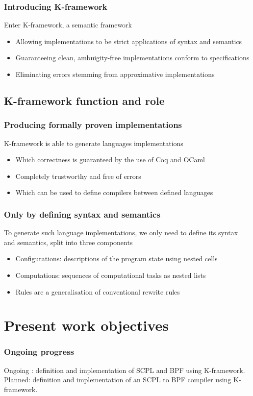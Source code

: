 \documentclass{beamer}
\begin{document}
\begin{frame}\frametitle{Introducing K-framework}
Enter K-framework, a semantic framework
\begin{itemize}[<+->]
	\item Allowing implementations to be strict applications of syntax and semantics
	\item Guaranteeing clean, ambuigity-free implementations conform to specifications
	\item Eliminating errors stemming from approximative implementations
\end{itemize}
\end{frame}

\subsection{K-framework function and role}
\begin{frame}\frametitle{Producing formally proven implementations}
K-framework is able to generate languages implementations
\begin{itemize}[<+->]
	\item Which correctness is guaranteed by the use of Coq and OCaml
	\item Completely trustworthy and free of errors
	\item Which can be used to define compilers between defined languages
\end{itemize}
\end{frame}

\begin{frame}\frametitle{Only by defining syntax and semantics}
To generate such language implementations, we only need to define its syntax and semantics, split into three components
\begin{itemize}[<+->]
	\item Configurations: descriptions of the program state using nested cells
	\item Computations: sequences of computational tasks as nested lists
	\item Rules are a generalisation of conventional rewrite rules
\end{itemize}
\end{frame}


\section{Present work objectives} 
\begin{frame}\frametitle{Ongoing progress} 
Ongoing : definition and implementation of SCPL and BPF using K-framework.
Planned: definition and implementation of an SCPL to BPF compiler using K-framework.
\end{frame}
\end{document}
